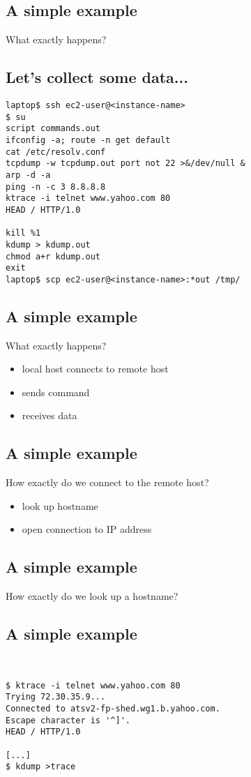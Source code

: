 \documentclass[xga]{xdvislides}
\begin{document}
\subsection{A simple example}
What exactly happens?

\subsection{Let's collect some data...}
\begin{verbatim}
laptop$ ssh ec2-user@<instance-name>
$ su
script commands.out
ifconfig -a; route -n get default
cat /etc/resolv.conf
tcpdump -w tcpdump.out port not 22 >&/dev/null &
arp -d -a
ping -n -c 3 8.8.8.8
ktrace -i telnet www.yahoo.com 80
HEAD / HTTP/1.0

kill %1
kdump > kdump.out
chmod a+r kdump.out
exit
laptop$ scp ec2-user@<instance-name>:*out /tmp/
\end{verbatim}

\subsection{A simple example}
What exactly happens?
\\
\begin{itemize}
	\item local host connects to remote host
	\item sends command
	\item receives data
\end{itemize}

\subsection{A simple example}
How exactly do we connect to the remote host?
\\
\begin{itemize}
	\item look up hostname
	\item open connection to IP address
\end{itemize}

\subsection{A simple example}
How exactly do we look up a hostname?

\subsection{A simple example}
\\
\Hugesize
\begin{center}
\begin{verbatim}
$ ktrace -i telnet www.yahoo.com 80
Trying 72.30.35.9...
Connected to atsv2-fp-shed.wg1.b.yahoo.com.
Escape character is '^]'.
HEAD / HTTP/1.0

[...]
$ kdump >trace
\end{verbatim}
\end{center}
\Normalsize
\vspace*{\fill}
\end{document}
